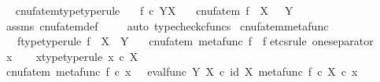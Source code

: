 \begin{isabellebody}
\endisatagproof
{\isafoldproof}%
%
\isadelimproof
\ \isanewline
%
\endisadelimproof
\isanewline
{}\isamarkupfalse%
\ cnufatem{\isacharunderscore}{\kern0pt}type{\isacharbrackleft}{\kern0pt}type{\isacharunderscore}{\kern0pt}rule{\isacharbrackright}{\kern0pt}{\isacharcolon}{\kern0pt}\isanewline
\ \ \ {\isachardoublequoteopen}f\ {\isasymin}\isactrlsub c\ Y\isactrlbsup X\isactrlesup {\isachardoublequoteclose}\isanewline
\ \ \ {\isachardoublequoteopen}cnufatem\ f\ {\isacharcolon}{\kern0pt}\ X\ \ {\isasymrightarrow}\ Y{\isachardoublequoteclose}\isanewline
%
\isadelimproof
\ \ %
\endisadelimproof
%
\isatagproof
{}\isamarkupfalse%
\ assms\ cnufatem{\isacharunderscore}{\kern0pt}def{}\ \isanewline
\ \ \isamarkupfalse%
\ {\isacharparenleft}{\kern0pt}auto{\isacharcomma}{\kern0pt}\ typecheck{\isacharunderscore}{\kern0pt}cfuncs{\isacharparenright}{\kern0pt}%
\endisatagproof
{\isafoldproof}%
%
\isadelimproof
\isanewline
%
\endisadelimproof
\isanewline
{}\isamarkupfalse%
\ cnufatem{\isacharunderscore}{\kern0pt}metafunc{\isacharcolon}{\kern0pt}\isanewline
\ \ \ f{\isacharunderscore}{\kern0pt}type{\isacharbrackleft}{\kern0pt}type{\isacharunderscore}{\kern0pt}rule{\isacharbrackright}{\kern0pt}{\isacharcolon}{\kern0pt}\ {\isachardoublequoteopen}f\ {\isacharcolon}{\kern0pt}\ X\ {\isasymrightarrow}\ Y{\isachardoublequoteclose}\isanewline
\ \ \ {\isachardoublequoteopen}cnufatem\ {\isacharparenleft}{\kern0pt}metafunc\ f{\isacharparenright}{\kern0pt}\ {\isacharequal}{\kern0pt}\ f{\isachardoublequoteclose}\isanewline
%
\isadelimproof
%
\endisadelimproof
%
\isatagproof
{}\isamarkupfalse%
{\isacharparenleft}{\kern0pt}etcs{\isacharunderscore}{\kern0pt}rule\ one{\isacharunderscore}{\kern0pt}separator{\isacharparenright}{\kern0pt}\isanewline
\ \ \isamarkupfalse%
\ x\isanewline
\ \ \isamarkupfalse%
\ x{\isacharunderscore}{\kern0pt}type{\isacharbrackleft}{\kern0pt}type{\isacharunderscore}{\kern0pt}rule{\isacharbrackright}{\kern0pt}{\isacharcolon}{\kern0pt}\ {\isachardoublequoteopen}x\ {\isasymin}\isactrlsub c\ X{\isachardoublequoteclose}\isanewline
\isanewline
\ \ \isamarkupfalse%
\ {\isachardoublequoteopen}cnufatem\ {\isacharparenleft}{\kern0pt}metafunc\ f{\isacharparenright}{\kern0pt}\ {\isasymcirc}\isactrlsub c\ x\ {\isacharequal}{\kern0pt}\ \ eval{\isacharunderscore}{\kern0pt}func\ Y\ X\ {\isasymcirc}\isactrlsub c\ {\isasymlangle}id\ X{\isacharcomma}{\kern0pt}\ {\isacharparenleft}{\kern0pt}metafunc\ f{\isacharparenright}{\kern0pt}\ {\isasymcirc}\isactrlsub c\ {\isasymbeta}\isactrlbsub X\isactrlesub {\isasymrangle}\ {\isasymcirc}\isactrlsub c\ x{\isachardoublequoteclose}\isanewline

\end{isabellebody}
